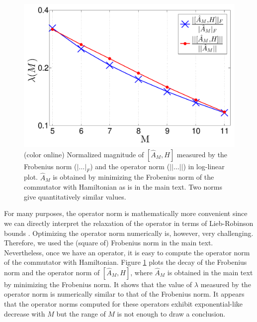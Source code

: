 \documentclass[twocolumn,superscriptaddress, prl,showpacs]{revtex4-1}
\begin{document}
\begin{figure}
\includegraphics[width=1.0\linewidth]{infinite_ham_opnorm.pdf}
\centering
\caption{(color online) Normalized magnitude of $[\hat{A}_M, H]$ measured by the Frobenius norm ($|\ldots|_F$) and the operator norm ($||\ldots||$)
in log-linear plot.
$\hat{A}_M$ is obtained by minimizing the Frobenius norm of the commutator with Hamiltonian as is in the main text.
Two norms give quantitatively similar values.
}
\label{fig:op_norm}
\end{figure}

For many purposes, the operator norm is mathematically more convenient
since we can directly interpret the relaxation of the operator in terms of Lieb-Robinson bounds \cite{Lieb:1972,Bravyi:2006}.
Optimizing the operator norm numerically is, however, very challenging. Therefore, we used the (square of) Frobenius norm in the main text.
Nevertheless, once we have an operator, it is easy to compute the operator norm of the commutator with Hamiltonian.
Figure \ref{fig:op_norm} plots the decay of the Frobenius norm and the operator norm of $[\hat{A}_M,H]$,
where $\hat{A}_M$ is obtained in the main text by minimizing the Frobenius norm.
It shows that the value of $\lambda$ measured by the operator norm is numerically similar to that of the Frobenius norm.
It appears that the operator norms computed for these operators exhibit exponential-like decrease with $M$ but
the range of $M$ is not enough to draw a conclusion.
\end{document}
